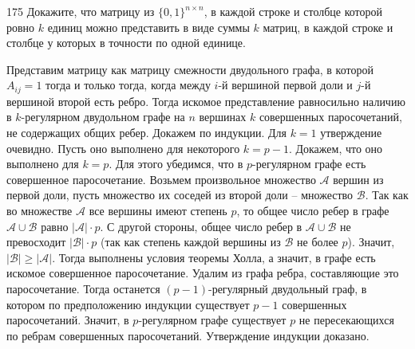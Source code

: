 \begin{task}{175}
Докажите, что матрицу из $\{0, 1\}^{n \times n}$, в каждой строке и столбце которой ровно $k$ единиц можно представить в виде суммы $k$ матриц, в каждой строке и столбце у которых в точности по одной единице.
\end{task}

\begin{solution}
Представим матрицу как матрицу смежности двудольного графа, в которой $A_{ij} = 1$ тогда и только тогда, когда между $i$-й вершиной первой доли и $j$-й вершиной второй есть ребро. Тогда искомое представление равносильно наличию в $k$-регулярном двудольном графе на $n$ вершинах $k$ совершенных паросочетаний, не содержащих общих ребер. Докажем по индукции. Для $k = 1$ утверждение очевидно. Пусть оно выполнено для некоторого $k = p - 1$. Докажем, что оно выполнено для $k = p$. Для этого убедимся, что в $p$-регулярном графе есть совершенное паросочетание. Возьмем произвольное множество $\mathcal{A}$ вершин из первой доли, пусть множество их соседей из второй доли -- множество $\mathcal{B}$. Так как во множестве $\mathcal{A}$ все вершины имеют степень $p$, то общее число ребер в графе $\mathcal{A} \cup \mathcal{B}$ равно $|\mathcal{A}|\cdot p$. С другой стороны, общее число ребер в $\mathcal{A} \cup \mathcal{B}$ не превосходит $|\mathcal{B}|\cdot p$ (так как степень каждой вершины из $\mathcal{B}$ не более $p$). Значит, $|\mathcal{B}| \geq |\mathcal{A}|$. Тогда выполнены условия теоремы Холла, а значит, в графе есть искомое совершенное паросочетание. Удалим из графа ребра, составляющие это паросочетание. Тогда останется $(p - 1)$-регулярный двудольный граф, в котором по предположению индукции существует $p - 1$ совершенных паросочетаний. Значит, в $p$-регулярном графе существует $p$ не пересекающихся по ребрам совершенных паросочетаний. Утверждение индукции доказано.
\end{solution}